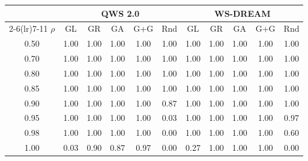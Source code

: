 \begin{tabular}{ccccccccccc}
\toprule
 & \multicolumn{5}{c}{QWS 2.0} & \multicolumn{5}{c}{WS-DREAM} \\
\cmidrule(lr){2-6}\cmidrule(lr){7-11}
$\rho$ & GL & GR & GA & G+G & Rnd & GL & GR & GA & G+G & Rnd \\
\midrule
0.50 & 1.00 & 1.00 & 1.00 & 1.00 & 1.00 & 1.00 & 1.00 & 1.00 & 1.00 & 1.00 \\
0.70 & 1.00 & 1.00 & 1.00 & 1.00 & 1.00 & 1.00 & 1.00 & 1.00 & 1.00 & 1.00 \\
0.80 & 1.00 & 1.00 & 1.00 & 1.00 & 1.00 & 1.00 & 1.00 & 1.00 & 1.00 & 1.00 \\
0.85 & 1.00 & 1.00 & 1.00 & 1.00 & 1.00 & 1.00 & 1.00 & 1.00 & 1.00 & 1.00 \\
0.90 & 1.00 & 1.00 & 1.00 & 1.00 & 0.87 & 1.00 & 1.00 & 1.00 & 1.00 & 1.00 \\
0.95 & 1.00 & 1.00 & 1.00 & 1.00 & 0.03 & 1.00 & 1.00 & 1.00 & 1.00 & 0.97 \\
0.98 & 1.00 & 1.00 & 1.00 & 1.00 & 0.00 & 1.00 & 1.00 & 1.00 & 1.00 & 0.60 \\
1.00 & 0.03 & 0.90 & 0.87 & 0.97 & 0.00 & 0.27 & 1.00 & 1.00 & 1.00 & 0.00 \\
\bottomrule
\end{tabular}
